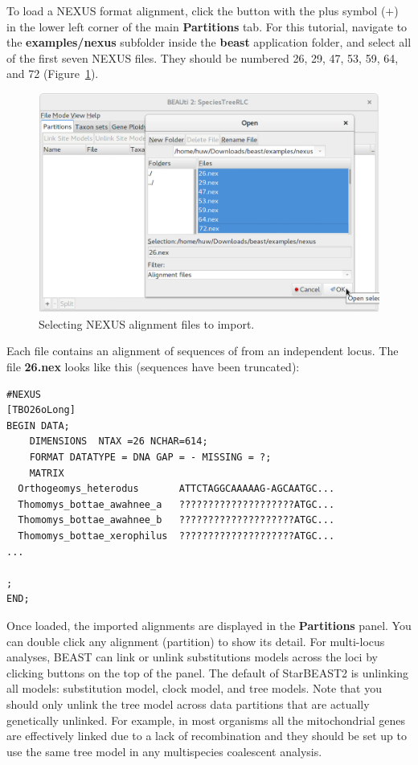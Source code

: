 \documentclass{article}
\begin{document}
To load a NEXUS format alignment, click the button with the plus symbol ($+$) in
the lower left corner of the main \textbf{Partitions} tab. For this tutorial,
navigate to the \textbf{examples/nexus} subfolder inside the \textbf{beast}
application folder, and select all of the first seven NEXUS files. They should
be numbered 26, 29, 47, 53, 59, 64, and 72 (Figure~\ref{fig:importAlignments}).

\begin{figure}[htb!]
\centering
\includegraphics[width=\textwidth]{figures/beauti-import.png}
\caption{Selecting NEXUS alignment files to import.}
\label{fig:importAlignments}
\end{figure}

Each file contains an alignment of sequences of from an independent locus. The
file \textbf{26.nex} looks like this (sequences have been truncated):

\begin{minipage}[h]{0.7\textwidth}
\begin{verbatim}
#NEXUS
[TBO26oLong]
BEGIN DATA;
	DIMENSIONS  NTAX =26 NCHAR=614;
	FORMAT DATATYPE = DNA GAP = - MISSING = ?;
	MATRIX	
  Orthogeomys_heterodus       ATTCTAGGCAAAAAG-AGCAATGC...
  Thomomys_bottae_awahnee_a   ????????????????????ATGC...
  Thomomys_bottae_awahnee_b   ????????????????????ATGC...
  Thomomys_bottae_xerophilus  ????????????????????ATGC...
...

;
END;
\end{verbatim}
\end{minipage}

\vspace{12pt}

Once loaded, the imported alignments are displayed in the \textbf{Partitions}
panel. You can double click any alignment (partition) to show its detail. For
multi-locus analyses, BEAST can link or unlink substitutions models across the
loci by clicking buttons on the top of the panel. The default of StarBEAST2 is
unlinking all models: substitution model, clock model, and tree models. Note
that you should only unlink the tree model across data partitions that are
actually genetically unlinked. For example, in most organisms all the
mitochondrial genes are effectively linked due to a lack of recombination and
they should be set up to use the same tree model in any multispecies coalescent
analysis.
\end{document}
